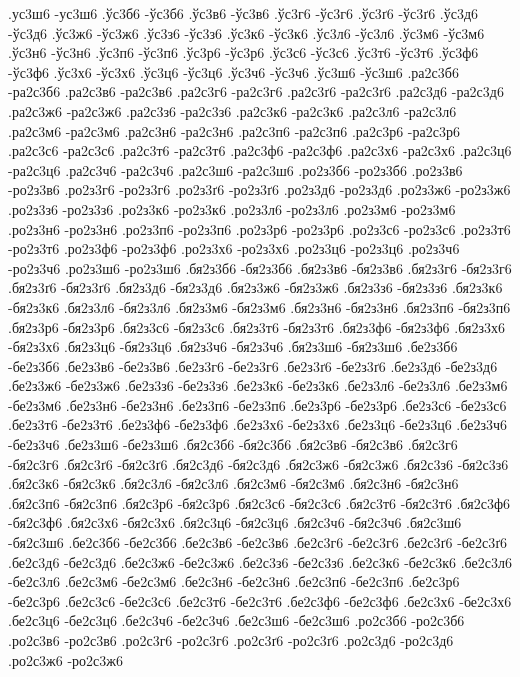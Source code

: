 {.ус3ш6 -ус3ш6
.ўс3б6 -ўс3б6
.ўс3в6 -ўс3в6
.ўс3г6 -ўс3г6
.ўс3ґ6 -ўс3ґ6
.ўс3д6 -ўс3д6
.ўс3ж6 -ўс3ж6
.ўс3з6 -ўс3з6
.ўс3к6 -ўс3к6
.ўс3л6 -ўс3л6
.ўс3м6 -ўс3м6
.ўс3н6 -ўс3н6
.ўс3п6 -ўс3п6
.ўс3р6 -ўс3р6
.ўс3с6 -ўс3с6
.ўс3т6 -ўс3т6
.ўс3ф6 -ўс3ф6
.ўс3х6 -ўс3х6
.ўс3ц6 -ўс3ц6
.ўс3ч6 -ўс3ч6
.ўс3ш6 -ўс3ш6
.ра2с3б6 -ра2с3б6
.ра2с3в6 -ра2с3в6
.ра2с3г6 -ра2с3г6
.ра2с3ґ6 -ра2с3ґ6
.ра2с3д6 -ра2с3д6
.ра2с3ж6 -ра2с3ж6
.ра2с3з6 -ра2с3з6
.ра2с3к6 -ра2с3к6
.ра2с3л6 -ра2с3л6
.ра2с3м6 -ра2с3м6
.ра2с3н6 -ра2с3н6
.ра2с3п6 -ра2с3п6
.ра2с3р6 -ра2с3р6
.ра2с3с6 -ра2с3с6
.ра2с3т6 -ра2с3т6
.ра2с3ф6 -ра2с3ф6
.ра2с3х6 -ра2с3х6
.ра2с3ц6 -ра2с3ц6
.ра2с3ч6 -ра2с3ч6
.ра2с3ш6 -ра2с3ш6
.ро2з3б6 -ро2з3б6
.ро2з3в6 -ро2з3в6
.ро2з3г6 -ро2з3г6
.ро2з3ґ6 -ро2з3ґ6
.ро2з3д6 -ро2з3д6
.ро2з3ж6 -ро2з3ж6
.ро2з3з6 -ро2з3з6
.ро2з3к6 -ро2з3к6
.ро2з3л6 -ро2з3л6
.ро2з3м6 -ро2з3м6
.ро2з3н6 -ро2з3н6
.ро2з3п6 -ро2з3п6
.ро2з3р6 -ро2з3р6
.ро2з3с6 -ро2з3с6
.ро2з3т6 -ро2з3т6
.ро2з3ф6 -ро2з3ф6
.ро2з3х6 -ро2з3х6
.ро2з3ц6 -ро2з3ц6
.ро2з3ч6 -ро2з3ч6
.ро2з3ш6 -ро2з3ш6
.бя2з3б6 -бя2з3б6
.бя2з3в6 -бя2з3в6
.бя2з3г6 -бя2з3г6
.бя2з3ґ6 -бя2з3ґ6
.бя2з3д6 -бя2з3д6
.бя2з3ж6 -бя2з3ж6
.бя2з3з6 -бя2з3з6
.бя2з3к6 -бя2з3к6
.бя2з3л6 -бя2з3л6
.бя2з3м6 -бя2з3м6
.бя2з3н6 -бя2з3н6
.бя2з3п6 -бя2з3п6
.бя2з3р6 -бя2з3р6
.бя2з3с6 -бя2з3с6
.бя2з3т6 -бя2з3т6
.бя2з3ф6 -бя2з3ф6
.бя2з3х6 -бя2з3х6
.бя2з3ц6 -бя2з3ц6
.бя2з3ч6 -бя2з3ч6
.бя2з3ш6 -бя2з3ш6
.бе2з3б6 -бе2з3б6
.бе2з3в6 -бе2з3в6
.бе2з3г6 -бе2з3г6
.бе2з3ґ6 -бе2з3ґ6
.бе2з3д6 -бе2з3д6
.бе2з3ж6 -бе2з3ж6
.бе2з3з6 -бе2з3з6
.бе2з3к6 -бе2з3к6
.бе2з3л6 -бе2з3л6
.бе2з3м6 -бе2з3м6
.бе2з3н6 -бе2з3н6
.бе2з3п6 -бе2з3п6
.бе2з3р6 -бе2з3р6
.бе2з3с6 -бе2з3с6
.бе2з3т6 -бе2з3т6
.бе2з3ф6 -бе2з3ф6
.бе2з3х6 -бе2з3х6
.бе2з3ц6 -бе2з3ц6
.бе2з3ч6 -бе2з3ч6
.бе2з3ш6 -бе2з3ш6
.бя2с3б6 -бя2с3б6
.бя2с3в6 -бя2с3в6
.бя2с3г6 -бя2с3г6
.бя2с3ґ6 -бя2с3ґ6
.бя2с3д6 -бя2с3д6
.бя2с3ж6 -бя2с3ж6
.бя2с3з6 -бя2с3з6
.бя2с3к6 -бя2с3к6
.бя2с3л6 -бя2с3л6
.бя2с3м6 -бя2с3м6
.бя2с3н6 -бя2с3н6
.бя2с3п6 -бя2с3п6
.бя2с3р6 -бя2с3р6
.бя2с3с6 -бя2с3с6
.бя2с3т6 -бя2с3т6
.бя2с3ф6 -бя2с3ф6
.бя2с3х6 -бя2с3х6
.бя2с3ц6 -бя2с3ц6
.бя2с3ч6 -бя2с3ч6
.бя2с3ш6 -бя2с3ш6
.бе2с3б6 -бе2с3б6
.бе2с3в6 -бе2с3в6
.бе2с3г6 -бе2с3г6
.бе2с3ґ6 -бе2с3ґ6
.бе2с3д6 -бе2с3д6
.бе2с3ж6 -бе2с3ж6
.бе2с3з6 -бе2с3з6
.бе2с3к6 -бе2с3к6
.бе2с3л6 -бе2с3л6
.бе2с3м6 -бе2с3м6
.бе2с3н6 -бе2с3н6
.бе2с3п6 -бе2с3п6
.бе2с3р6 -бе2с3р6
.бе2с3с6 -бе2с3с6
.бе2с3т6 -бе2с3т6
.бе2с3ф6 -бе2с3ф6
.бе2с3х6 -бе2с3х6
.бе2с3ц6 -бе2с3ц6
.бе2с3ч6 -бе2с3ч6
.бе2с3ш6 -бе2с3ш6
.ро2с3б6 -ро2с3б6
.ро2с3в6 -ро2с3в6
.ро2с3г6 -ро2с3г6
.ро2с3ґ6 -ро2с3ґ6
.ро2с3д6 -ро2с3д6
.ро2с3ж6 -ро2с3ж6
}

